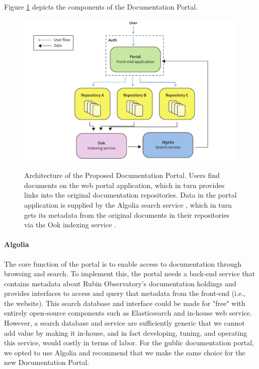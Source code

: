 Figure \ref{fig:portal-architecture} depicts the components of the Documentation Portal.

\begin{figure}[t]
\caption{Architecture of the Proposed Documentation Portal.
Users find documents on the web portal application, which in turn provides links into the original documentation repositories.
Data in the portal application is supplied by the Algolia search service \citep{Algolia-cite}, which in turn gets its metadata from the original documents in their repositories via the Ook indexing service \citep{ook-cite}.}
\centering
\includegraphics[width=\textwidth]{portal-architecture}
\label{fig:portal-architecture}
\end{figure}

\paragraph{Algolia}

The core function of the portal is to enable access to documentation through browsing and search.
To implement this, the portal needs a back-end service that contains metadata about Rubin Observatory's documentation holdings and provides interfaces to access and query that metadata from the front-end (i.e., the website).
This search database and interface could be made for "free" with entirely open-source components such as Elasticsearch \citep{elastic-cite} and in-house web service.
However, a search database and service are sufficiently generic that we cannot add value by making it in-house, and in fact developing, tuning, and operating this service, would costly in terms of labor.
For the \href{www.lsst.io} public documentation portal, we opted to use Algolia and recommend that we make the same choice for the new Documentation Portal.


